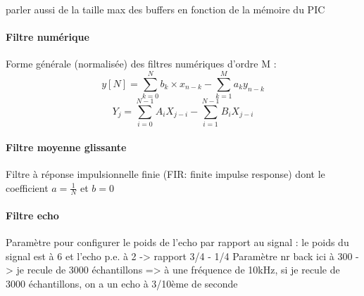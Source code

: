\documentclass{article}
\begin{document}








    parler aussi de la taille max des buffers en fonction de la mémoire du PIC


    \paragraph{Filtre numérique}
    Forme générale (normalisée) des filtres numériques d'ordre M :
    $$ y[N] = \sum\limits_{k=0}^{N} b_k \times x_{n-k} - \sum\limits_{k=1}^{M} a_k y_{n-k} $$
    $$ Y_j = \sum\limits_{i=0}^{N-1} A_i X_{j-i} - \sum\limits_{i=1}^{N-1} B_i X_{j-i} $$

    \paragraph{Filtre moyenne glissante}
    Filtre à réponse impulsionnelle finie (FIR: finite impulse response) dont le coefficient $a = \frac{1}{N}$ et $b = 0$


    \paragraph{Filtre echo}
    Paramètre pour configurer le poids de l'echo par rapport au signal : le poids du signal est à 6 et l'echo p.e. à 2 -> rapport 3/4 - 1/4
    Paramètre nr back ici à 300 -> je recule de 3000 échantillons => à une fréquence de 10kHz, si je recule de 3000 échantillons, on a un echo à 3/10ème de seconde
\end{document}
